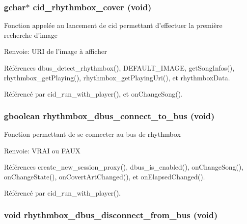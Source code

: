 \subsubsection{\setlength{\rightskip}{0pt plus 5cm}gchar$\ast$ cid\_\-rhythmbox\_\-cover (void)}\label{cid-rhythmbox_8c_b2db9c96d508bfa1a0b7ae7724300754}


Fonction appelée au lancement de cid permettant d'effectuer la première recherche d'image \begin{Desc}
\item[Renvoie:]URI de l'image à afficher \end{Desc}


Références dbus\_\-detect\_\-rhythmbox(), DEFAULT\_\-IMAGE, getSongInfos(), rhythmbox\_\-getPlaying(), rhythmbox\_\-getPlayingUri(), et rhythmboxData.

Référencé par cid\_\-run\_\-with\_\-player(), et onChangeSong().
\subsubsection{\setlength{\rightskip}{0pt plus 5cm}gboolean rhythmbox\_\-dbus\_\-connect\_\-to\_\-bus (void)}\label{cid-rhythmbox_8c_a6a66092538332b34ee5acc530e856f4}


Fonction permettant de se connecter au bus de rhythmbox \begin{Desc}
\item[Renvoie:]VRAI ou FAUX \end{Desc}


Références create\_\-new\_\-session\_\-proxy(), dbus\_\-is\_\-enabled(), onChangeSong(), onChangeState(), onCovertArtChanged(), et onElapsedChanged().

Référencé par cid\_\-run\_\-with\_\-player().
\subsubsection{\setlength{\rightskip}{0pt plus 5cm}void rhythmbox\_\-dbus\_\-disconnect\_\-from\_\-bus (void)}\label{cid-rhythmbox_8c_c9ca0699d0cbcad34db859ae52f84a23}


